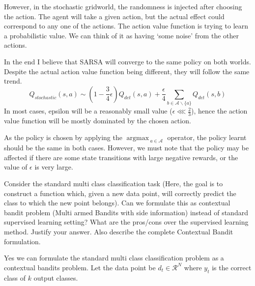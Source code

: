 \documentclass[addpoints,12pt,solution]{exam}
\DeclareMathOperator*{\argmax}{argmax\,}
\begin{document}
\begin{questions}
\begin{enumerate}[label=(\alph*)]
\begin{solution}
                However, in the stochastic gridworld, the randomness is injected after choosing the action. The agent will take a given action, but the actual effect could correspond to any one of the actions.
                The action value function is trying to learn a probabilistic value. We can think of it as having `some noise' from the other actions.


                In the end I believe that SARSA will converge to the same policy on both worlds. Despite the actual action value function being different, they will follow the same trend.
                \[
                    Q_{stochastic}(s, a) \sim \left(1-\frac{3}{4}\epsilon\right)Q_{det}(s, a) + \frac{\epsilon}{4}\sum_{b \in \mathcal{A} \backslash \{a\}}Q_{det}(s, b)
                \]
                In most cases, epsilon will be a reasonably small value ($\epsilon \lll \frac{2}{3}$), hence the action value function will be mostly dominated by the chosen action.


                As the policy is chosen by applying the $\argmax_{a\in \mathcal{A}}$ operator, the policy learnt should be the same in both cases.
                However, we must note that the policy may be affected if there are some state transitions with large negative rewards, or the value of $\epsilon$ is very large.

            \end{solution}

        \end{enumerate}

         Consider the standard multi class classification task (Here, the goal is to construct a function which, given a new data point, will correctly predict the class to which the new point belongs). Can we formulate this as contextual bandit problem (Multi armed Bandits with side information) instead of standard supervised learning setting? What are the pros/cons over the supervised learning method. Justify your answer. Also describe the complete Contextual Bandit formulation.

        \begin{solution}
            Yes we can formulate the standard multi class classification problem as a contextual bandits problem.
            Let the data point be $d_t \in \mathcal{R}^N$ where $y_t$ is the correct class of  $k$ output classes.


\end{solution}
\end{questions}
\end{document}
